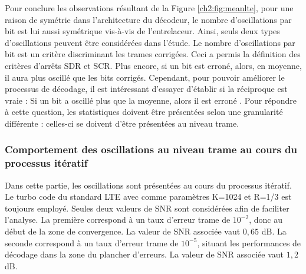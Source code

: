 Pour conclure les observations résultant de la Figure \ref{ch2:fig:meanlte}, pour une raison de symétrie dans l'architecture 
du décodeur, le nombre d'oscillations par bit est lui aussi symétrique vis-à-vis de l'entrelaceur. Ainsi, seuls deux types 
d'oscillations peuvent être considérées dans l'étude. Le nombre d’oscillations par bit est un critère discriminant les trames 
corrigées. Ceci a permis la définition des critères d'arrêts SDR et SCR. Plus encore, si un bit est erroné, alors, en moyenne, 
il aura plus oscillé que les bits corrigés. Cependant, pour pouvoir améliorer le processus de décodage, il est intéressant 
d'essayer d'établir si la réciproque est vraie : 
\og Si un bit a oscillé plus que la moyenne, alors il est erroné \fg. Pour répondre à cette question, les statistiques doivent
être présentées selon une granularité différente : celles-ci se doivent d'être présentées au niveau trame.

\subsubsection{Comportement des oscillations au niveau trame au cours du processus itératif} 
Dans cette partie, les oscillations sont présentées au cours du processus itératif. Le turbo code du standard LTE avec 
comme paramètres K=1024 et R=1/3 est toujours employé. Seules deux valeurs de SNR sont considérées afin de faciliter 
l'analyse. La première correspond à un taux d'erreur trame de $10^{-2}$, donc au début de la zone de convergence. La valeur 
de SNR associée vaut $0,65$ dB. La seconde correspond à un taux d'erreur trame de $10^{-5}$, situant les performances de 
décodage dans la zone du plancher d'erreurs. La valeur de SNR associée vaut $1,2$ dB.


